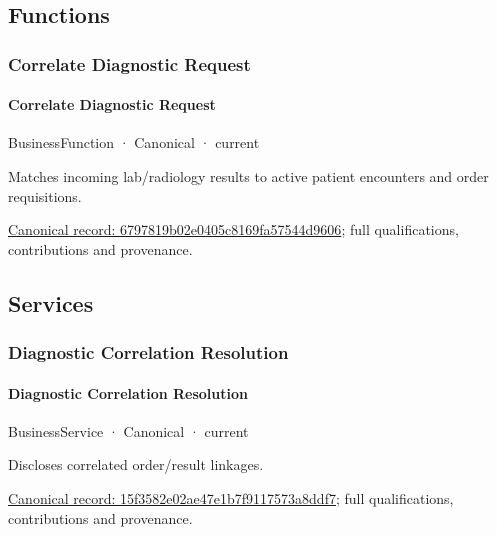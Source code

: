 \subsection{Functions}

\subsubsection{Correlate Diagnostic Request}

\paragraph{Correlate Diagnostic Request}

\label{element:6797819b02e0405c8169fa57544d9606}
{\small BusinessFunction · Canonical · current}\par

Matches incoming lab/radiology results to active patient encounters and order requisitions.


{\footnotesize \href{../../../../continuum/business/business-function/6797819b02e0405c8169fa57544d9606.md}{Canonical record: 6797819b02e0405c8169fa57544d9606}; full qualifications, contributions and provenance.}\par
\subsection{Services}

\subsubsection{Diagnostic Correlation Resolution}

\paragraph{Diagnostic Correlation Resolution}

\label{element:15f3582e02ae47e1b7f9117573a8ddf7}
{\small BusinessService · Canonical · current}\par

Discloses correlated order/result linkages.


{\footnotesize \href{../../../../continuum/business/business-service/15f3582e02ae47e1b7f9117573a8ddf7.md}{Canonical record: 15f3582e02ae47e1b7f9117573a8ddf7}; full qualifications, contributions and provenance.}\par
